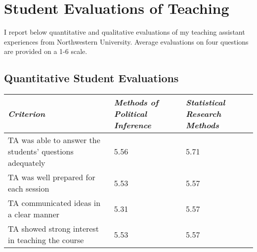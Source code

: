 \documentclass[12pt]{article}
\begin{document}

\clearpage

\section{Student Evaluations of Teaching}

I report below quantitative and qualitative evaluations of my teaching assistant experiences from Northwestern University. Average evaluations on four questions are provided on a 1-6 scale.\\

\subsection{Quantitative Student Evaluations}
\begin{center}
\begin{tabular}{p{3.25in} p{1.25in} p{1.25in}}\toprule
\emph{Criterion}	
&\emph{Methods of Political Inference}	
&\emph{Statistical Research Methods}\\ \midrule
TA was able to answer the students' questions adequately 	&5.56	&5.71\\
TA was well prepared for each session 					&5.53	&5.57\\
TA communicated ideas in a clear manner 				&5.31	& 5.57\\
TA showed strong interest in teaching the course 			&5.53	&5.57\\
\bottomrule
\end{tabular}
\end{center}
\end{document}
